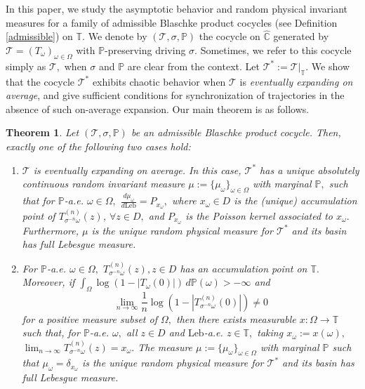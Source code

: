 \documentclass[12pt,reqno]{amsart}
\newtheorem{theorem}{Theorem}
\numberwithin{theorem}{section}
\begin{document}
In this paper, we study the asymptotic behavior and random physical invariant measures for a family of admissible Blaschke product cocycles (see Definition \ref{admissible}) on $\mathbb{T}.$ We denote by $(\mathcal{T}, \sigma,\mathbb{P})$ the cocycle on $\hat{\mathbb{C}}$ generated by $\mathcal{T}=(T_{\omega})_{\omega\in\Omega}$ with $\mathbb{P}$-preserving driving $\sigma.$ Sometimes, we refer to this cocycle simply as $\mathcal{T},$ when $\sigma$ and $\mathbb{P}$ are clear from the context. Let $\mathcal{T}^{*}:=\mathcal{T}|_{\mathbb{T}}.$ We show that the cocycle $\mathcal{T}^{*}$ exhibits chaotic behavior when $\mathcal{T}$ is \textit{eventually expanding on average}, and give sufficient conditions for synchronization of trajectories in the absence of such on-average expansion. Our main theorem is as follows. \begin{theorem}\label{possible_limits}
Let $(\mathcal{T},\sigma,\mathbb{P})$ be an admissible Blaschke product cocycle. Then, exactly one of the following two cases hold:
\begin{enumerate}
    \item $\mathcal{T}$ is eventually expanding on average. In this case, $\mathcal{T}^{*}$ has a unique absolutely continuous random invariant measure $\mu:=\{\mu_{\omega}\}_{\omega\in\Omega}$ with marginal $\mathbb{P},$ such that for $\mathbb{P}$-a.e. $\omega\in\Omega,$ $\frac{d\mu_{\omega}}{d\text{Leb}}=P_{x_{\omega}},$ where $x_{\omega}\in D$ is the (unique) accumulation point of $T_{\sigma^{-n}\omega}^{(n)}(z)$,  $\forall z\in D,$ and $P_{x_{\omega}}$ is the Poisson kernel associated to $x_{\omega}.$  Furthermore, $\mu$ is the unique random physical measure for $\mathcal{T}^{*}$ and its basin has full Lebesgue measure. 
    \item For $\mathbb{P}$-a.e. $\omega\in\Omega,$ $T_{\sigma^{-n}\omega}^{(n)}(z), z\in D$ has an accumulation point on $\mathbb{T}.$ Moreover, if $\int_{\Omega}\log\left(1-|T_{\omega}(0)|\right)\,d\mathbb{P}(\omega)>-\infty$ and $$\lim_{n\to\infty}\frac{1}{n}\log\left(1-|T_{\sigma^{-n}\omega}^{(n)}(0)|\right)\neq0$$ for a positive measure subset of $\Omega,$ then there exists measurable $x:\Omega\to\mathbb{T}$ such that, for $\mathbb{P}$-a.e. $\omega,$ all $z\in D$ and $\text{Leb}$-a.e. $z\in\mathbb{T},$ taking $x_{\omega}:=x(\omega),$  $\lim_{n\to\infty}T_{\sigma^{-n}\omega}^{(n)}(z)=x_{\omega}.$ The measure $\mu:=\{\mu_\omega\}_{\omega\in\Omega}$ with marginal $\mathbb{P}$ such that $\mu_{\omega}=\delta_{x_{\omega}}$ is the unique random physical measure for $\mathcal{T}^{*}$ and its basin has full Lebesgue measure. \label{case2}

\end{enumerate}
\end{theorem}
\end{document}
